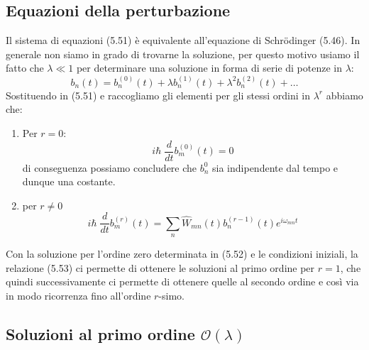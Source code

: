 \subsection{Equazioni della perturbazione}

Il sistema di equazioni (5.51) \`e equivalente all'equazione di Schr\"odinger (5.46). In generale non siamo in grado di trovarne la soluzione, per questo motivo usiamo il fatto che $\lambda \ll 1$ per determinare una soluzione in forma di serie di potenze in $\lambda$:
\begin{equation*}
	b_n(t) = b_n^{(0)}(t)+ \lambda b_n^{(1)}(t) + \lambda^2b_{n}^{(2)}(t)+\ldots
\end{equation*} 
Sostituendo in (5.51) e raccogliamo gli elementi per gli stessi ordini in $\lambda^r$ abbiamo che:
\begin{enumerate}
	\item Per $r =0$:
	\begin{equation}
		i\hbar \; \frac{d}{dt}b_m^{(0)}(t) = 0 
	\end{equation}
	di conseguenza possiamo concludere che $b_n^{0}$ sia indipendente dal tempo e dunque una costante.
	\item per $r \neq 0 $
	\begin{equation}
		i \hbar \; \frac{d}{dt}b_m^{(r)}(t) = \sum_{n}\hat{W}_{mn}(t)b_{n}^{(r-1)}(t)e^{i \omega_{mn}t}
	\end{equation} 
\end{enumerate} 
Con la soluzione per l'ordine zero determinata in (5.52) e le condizioni iniziali, la relazione (5.53) ci permette di ottenere le soluzioni al primo ordine per $r=1$, che quindi successivamente ci permette di ottenere quelle al secondo ordine e cos\`i via in modo ricorrenza fino all'ordine $r$-simo.

\subsection{Soluzioni al primo ordine $\mathcal{O}(\lambda)$}

